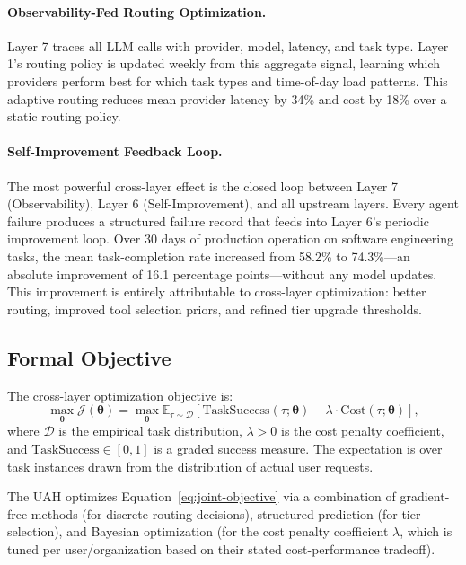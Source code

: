 \documentclass[11pt]{article}
\begin{document}
\paragraph{Observability-Fed Routing Optimization.}
Layer 7 traces all LLM calls with provider, model, latency, and task type.
Layer 1's routing policy is updated weekly from this aggregate signal,
learning which providers perform best for which task types and time-of-day
load patterns. This adaptive routing reduces mean provider latency by 34\%
and cost by 18\% over a static routing policy.

\paragraph{Self-Improvement Feedback Loop.}
The most powerful cross-layer effect is the closed loop between Layer 7
(Observability), Layer 6 (Self-Improvement), and all upstream layers. Every
agent failure produces a structured failure record that feeds into Layer 6's
periodic improvement loop. Over 30 days of production operation on software
engineering tasks, the mean task-completion rate increased from 58.2\% to
74.3\%---an absolute improvement of 16.1 percentage points---without any
model updates. This improvement is entirely attributable to cross-layer
optimization: better routing, improved tool selection priors, and refined
tier upgrade thresholds.

\subsection{Formal Objective}

The cross-layer optimization objective is:
\begin{equation}
    \max_{\bm{\theta}} \mathcal{J}(\bm{\theta})
    = \max_{\bm{\theta}} \mathbb{E}_{\tau \sim \mathcal{D}}\left[
        \text{TaskSuccess}(\tau; \bm{\theta}) - \lambda \cdot \text{Cost}(\tau; \bm{\theta})
    \right],
    \label{eq:joint-objective}
\end{equation}
where $\mathcal{D}$ is the empirical task distribution, $\lambda > 0$ is the
cost penalty coefficient, and $\text{TaskSuccess} \in [0, 1]$ is a graded
success measure. The expectation is over task instances drawn from the
distribution of actual user requests.

The UAH optimizes Equation~\ref{eq:joint-objective} via a combination of
gradient-free methods (for discrete routing decisions), structured prediction
(for tier selection), and Bayesian optimization (for the cost penalty
coefficient $\lambda$, which is tuned per user/organization based on their
stated cost-performance tradeoff).
\end{document}
